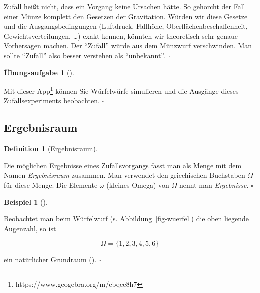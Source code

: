\documentclass[
  ngerman,
  letterpaper,
  twoside,
  open=any]{scrbook}
\theoremstyle{definition}
\newtheorem{example}{Beispiel}[chapter]
\theoremstyle{plain}
\theoremstyle{definition}
\newtheorem{exercise}{Übungsaufgabe}[chapter]
\theoremstyle{definition}
\newtheorem{definition}{Definition}[chapter]
\theoremstyle{definition}
\newtheorem{example}{Beispiel}[chapter]
\theoremstyle{definition}
\newtheorem{exercise}{Übungsaufgabe}[chapter]
\theoremstyle{remark}
\begin{document}
\begin{tcolorbox}[enhanced jigsaw, arc=.35mm, bottomrule=.15mm, bottomtitle=1mm, breakable, colback=white, colbacktitle=quarto-callout-caution-color!10!white, colframe=quarto-callout-caution-color-frame, coltitle=black, left=2mm, leftrule=.75mm, opacityback=0, opacitybacktitle=0.6, rightrule=.15mm, title=\textcolor{quarto-callout-caution-color}{\faFire}\hspace{0.5em}{Vorsicht}, titlerule=0mm, toprule=.15mm, toptitle=1mm]

Zufall heißt nicht, dass ein Vorgang keine Ursachen hätte. So gehorcht
der Fall einer Münze komplett den Gesetzen der Gravitation. Würden wir
diese Gesetze und die Ausgangsbedingungen (Luftdruck, Fallhöhe,
Oberflächenbeschaffenheit, Gewichtsverteilungen, \ldots) exakt kennen,
könnten wir theoretisch sehr genaue Vorhersagen machen. Der
\enquote{Zufall} würde aus dem Münzwurf verschwinden. Man sollte
\enquote{Zufall} also besser verstehen als \enquote{unbekannt}.
\(\square\)

\end{tcolorbox}

\begin{exercise}[]\protect\hypertarget{exr-würfel-geo}{}\label{exr-würfel-geo}

Mit dieser App\footnote{https://www.geogebra.org/m/cbqee8h7} können Sie
Würfelwürfe simulieren und die Ausgänge dieses Zufallsexperiments
beobachten. \(\square\)

\end{exercise}

\subsection{Ergebnisraum}\label{ergebnisraum}

\begin{definition}[Ergebnisraum]\protect\hypertarget{def-Ergebnisraum}{}\label{def-Ergebnisraum}

Die möglichen Ergebnisse eines Zufallsvorgangs fasst man als Menge mit
dem Namen \emph{Ergebnisraum} zusammen. Man verwendet den griechischen
Buchstaben \(\Omega\) für diese Menge. Die Elemente \(\omega\) (kleines
Omega) von \(\Omega\) nennt man \emph{Ergebnisse}. \(\square\)

\end{definition}

\begin{example}[]\protect\hypertarget{exm-grundraum}{}\label{exm-grundraum}

Beobachtet man beim Würfelwurf (s. Abbildung~\ref{fig-wuerfel}) die oben
liegende Augenzahl, so ist

\[\Omega = \{ 1,2,3,4,5,6 \}\]

ein natürlicher Grundraum ().
\(\square\)

\end{example}
\end{document}
